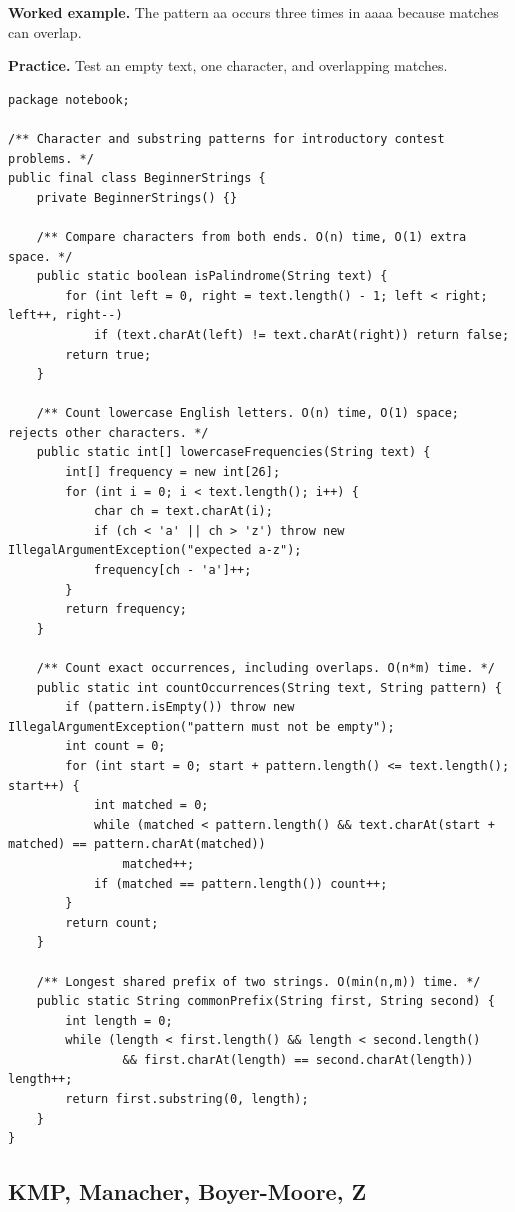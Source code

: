 \documentclass[10pt,letterpaper]{article}
\begin{document}
\noindent\textbf{Worked example.} The pattern aa occurs three times in aaaa because matches can overlap.\par
\noindent\textbf{Practice.} Test an empty text, one character, and overlapping matches.\par
\begin{lstlisting}
package notebook;

/** Character and substring patterns for introductory contest problems. */
public final class BeginnerStrings {
    private BeginnerStrings() {}

    /** Compare characters from both ends. O(n) time, O(1) extra space. */
    public static boolean isPalindrome(String text) {
        for (int left = 0, right = text.length() - 1; left < right; left++, right--)
            if (text.charAt(left) != text.charAt(right)) return false;
        return true;
    }

    /** Count lowercase English letters. O(n) time, O(1) space; rejects other characters. */
    public static int[] lowercaseFrequencies(String text) {
        int[] frequency = new int[26];
        for (int i = 0; i < text.length(); i++) {
            char ch = text.charAt(i);
            if (ch < 'a' || ch > 'z') throw new IllegalArgumentException("expected a-z");
            frequency[ch - 'a']++;
        }
        return frequency;
    }

    /** Count exact occurrences, including overlaps. O(n*m) time. */
    public static int countOccurrences(String text, String pattern) {
        if (pattern.isEmpty()) throw new IllegalArgumentException("pattern must not be empty");
        int count = 0;
        for (int start = 0; start + pattern.length() <= text.length(); start++) {
            int matched = 0;
            while (matched < pattern.length() && text.charAt(start + matched) == pattern.charAt(matched))
                matched++;
            if (matched == pattern.length()) count++;
        }
        return count;
    }

    /** Longest shared prefix of two strings. O(min(n,m)) time. */
    public static String commonPrefix(String first, String second) {
        int length = 0;
        while (length < first.length() && length < second.length()
                && first.charAt(length) == second.charAt(length)) length++;
        return first.substring(0, length);
    }
}
\end{lstlisting}
\subsection{KMP, Manacher, Boyer-Moore, Z}
\end{document}

